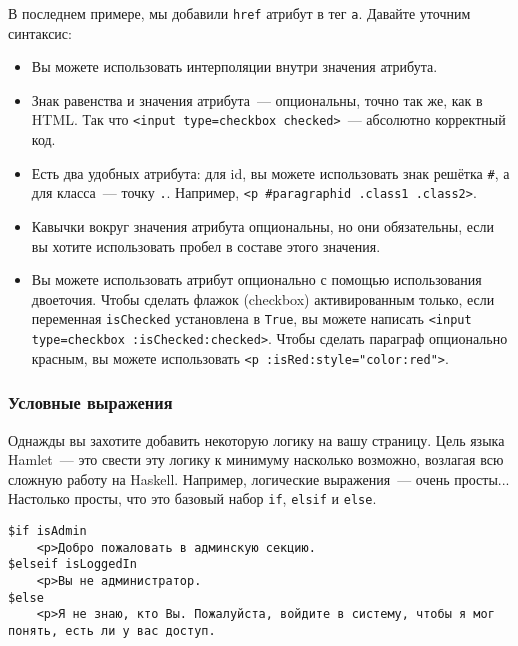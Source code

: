 В последнем примере, мы добавили \texttt{href} атрибут в тег \texttt{a}.
Давайте уточним синтаксис:

\begin{itemize}
    \item Вы можете использовать интерполяции внутри значения атрибута.

    \item Знак равенства и значения атрибута~--- опциональны, точно так же, как в
        HTML.  Так что \lstinline!<input type=checkbox checked>!~---
        абсолютно корректный код.

    \item Есть два удобных атрибута: для id, вы можете использовать знак
        решётка \lstinline'#', а для класса~--- точку \lstinline'.'. Например,
        \lstinline!<p #paragraphid .class1 .class2>!.

    \item Кавычки вокруг значения атрибута опциональны, но они обязательны,
        если вы хотите использовать пробел в составе этого значения.

    \item Вы можете использовать атрибут опционально с помощью использования
        двоеточия.  Чтобы сделать флажок (checkbox) активированным только, если
        переменная \lstinline!isChecked!  установлена в \lstinline!True!, вы
        можете написать \lstinline!<input type=checkbox :isChecked:checked>!.
        Чтобы сделать параграф опционально красным, вы можете использовать
        \lstinline!<p :isRed:style="color:red">!.
\end{itemize}

\subsubsection{Условные выражения}

Однажды вы захотите добавить некоторую логику на вашу страницу. Цель языка
Hamlet~--- это свести эту логику к минимуму насколько возможно, возлагая всю
сложную работу на Haskell. Например, логические выражения~--- очень просты...
Настолько просты, что это базовый набор \lstinline'if', \lstinline'elsif' и
\lstinline'else'.

\begin{lstlisting}
$if isAdmin
    <p>Добро пожаловать в админскую секцию.
$elseif isLoggedIn
    <p>Вы не администратор.
$else
    <p>Я не знаю, кто Вы. Пожалуйста, войдите в систему, чтобы я мог понять, есть ли у вас доступ.
\end{lstlisting}

